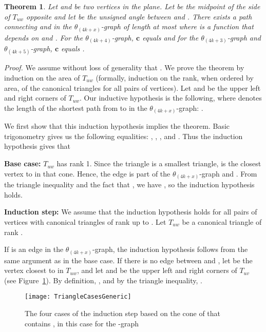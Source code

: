 \documentclass[12pt]{article}
\newtheorem{theo}[defin]{Theorem}
\newenvironment{theorem}{\begin{theo} \sl}{\end{theo}}
\newenvironment{proof}{\emph{Proof.}}{\hfill \\}
\newcommand{\graph}[1]{\ensuremath{\theta_{(4 k + #1)}}-graph\xspace}
\newcommand{\canon}[2]{\ensuremath{T_{#1 #2}}}
\newcommand{\const}{\ensuremath{\boldsymbol{c}}\xspace}
\begin{document}
\begin{theorem}
  \label{theo:PathLengthGeneric}
  Let  and  be two vertices in the plane. Let  be the midpoint of the side of \canon{u}{w} opposite  and let  be the unsigned angle between  and . There exists a path connecting  and  in the \graph{x} of length at most 
   where  is a function that depends on  and . For the \graph{4}, \const equals  and for the \graph{3} and \graph{5}, \const equals  .
\end{theorem}
\begin{proof}
  We assume without loss of generality that . We prove the theorem by induction on the area of \canon{u}{w} (formally, induction on the rank, when ordered by area, of the canonical triangles for all pairs of vertices). Let  and  be the upper left and right corners of \canon{u}{w}. Our inductive hypothesis is the following, where  denotes the length of the shortest path from  to  in the \graph{x}: . 

  We first show that this induction hypothesis implies the theorem. Basic trigonometry gives us the following equalities: , , , and . Thus the induction hypothesis gives that  

  \textbf{Base case:} \canon{u}{w} has rank 1. Since the triangle is a smallest triangle,  is the closest vertex to  in that cone. Hence, the edge  is part of the \graph{x} and . From the triangle inequality and the fact that , we have , so the induction hypothesis holds.

  \textbf{Induction step:} We assume that the induction hypothesis holds for all pairs of vertices with canonical triangles of rank up to . Let \canon{u}{w} be a canonical triangle of rank .

  If  is an edge in the \graph{x}, the induction hypothesis follows from the same argument as in the base case. If there is no edge between  and , let  be the vertex closest to  in \canon{u}{w}, and let  and  be the upper left and right corners of \canon{u}{v} (see Figure~\ref{fig:TriangleCasesGeneric}). By definition, , and by the triangle inequality, .

  \begin{figure}[ht]
    \begin{center}
      \texttt{[image: TriangleCasesGeneric]}
    \end{center}
    \caption{The four cases of the induction step based on the cone of  that contains , in this case for the -graph}
    \label{fig:TriangleCasesGeneric}
  \end{figure}


\end{proof}
\end{document}
